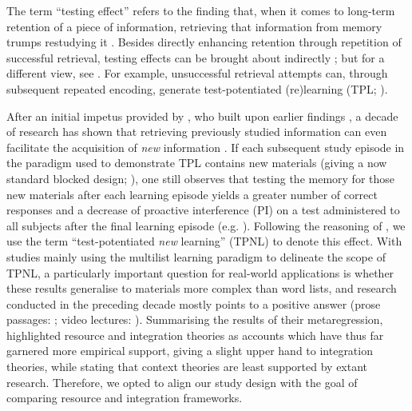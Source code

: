 \documentclass[../main.tex]{subfiles}
\begin{document}
The term ``testing effect'' refers to the finding that, when it comes to 
long-term retention of a piece of information, retrieving that information 
from memory trumps restudying it 
\citep{karpickeCriticalImportanceRetrieval2008,roedigeriiiPowerTestingMemory2006,
 roedigeriiiTestEnhancedLearningTaking2006, rowlandEffectTestingRestudy2014, 
adesopeRethinkingUseTests2017, roedigeriiiCriticalRoleRetrieval2011, 
gloverTestingPhenomenonNot1989}. Besides directly enhancing retention 
through repetition of successful retrieval, testing effects can be brought 
about indirectly \citealp{arnoldTestpotentiatedLearningDistinguishing2013, 
roedigeriiiPowerTestingMemory2006}; but for a different view, see 
\citealp{kornellRetrievalAttemptsEnhance2015}. For example, unsuccessful 
retrieval attempts can, through subsequent repeated encoding, generate 
test-potentiated (re)learning (TPL;
\citealp{izawaReinforcementTestSequencesPairedAssociate1966,izawaOptimalPotentiatingEffects1970,
 kornellUnsuccessfulRetrievalAttempts2009, arnoldFreeRecallEnhances2013, 
arnoldTestpotentiatedLearningDistinguishing2013, 
wissmanTestpotentiatedLearningThree2018}).

After an initial impetus provided by 
\cite{szpunarTestingStudyInsulates2008}, who built upon earlier findings 
\citep{darleyEffectsPriorFree1971, tulvingNegativeTransferEffects1974}, a 
decade of research has shown that retrieving previously studied information 
can even facilitate the acquisition of \textit{new} information 
\cite{chanRetrievalPotentiatesNew2018, 
pastotterRetrievalPracticeEnhances2014, yangEnhancingLearningRetrieval2018}. 
If each subsequent study episode in the paradigm used to demonstrate TPL 
contains new materials (giving a now standard blocked design; 
\citealp{chanTestingPotentiatesNew2018}), one still observes that testing 
the memory for those new materials after each learning episode yields a 
greater number of correct responses and a decrease of proactive interference 
(PI) on a test administered to all subjects after the final learning episode 
(e.g. \citealp{szpunarInterpolatedMemoryTests2013, 
szpunarTestingStudyInsulates2008, wissmanInterimTestEffect2011}). Following 
the reasoning of \cite{chanRetrievalPotentiatesNew2018}, we use the term 
``test-potentiated \textit{new} learning'' (TPNL) to denote this effect.
With studies mainly using the multilist learning paradigm to delineate the 
scope of TPNL, a particularly important question for real-world applications 
is whether these results generalise to materials more complex than word 
lists, and research conducted in the preceding decade mostly points to a 
positive answer (prose passages: \citealp{wissmanInterimTestEffect2011, 
divisRetrievalSpeedsContext2014}; video lectures: 
\citealp{szpunarInterpolatedMemoryTests2013, 
jingInterpolatedTestingInfluences2016}). Summarising the results of their 
metaregression, \cite{chanRetrievalPotentiatesNew2018} highlighted resource 
and integration theories as accounts which have thus far garnered more 
empirical support, giving a slight upper hand to integration theories, while 
stating that context theories are least supported by extant research. 
Therefore, we opted to align our study design with the goal of comparing 
resource and integration frameworks.
\end{document}
